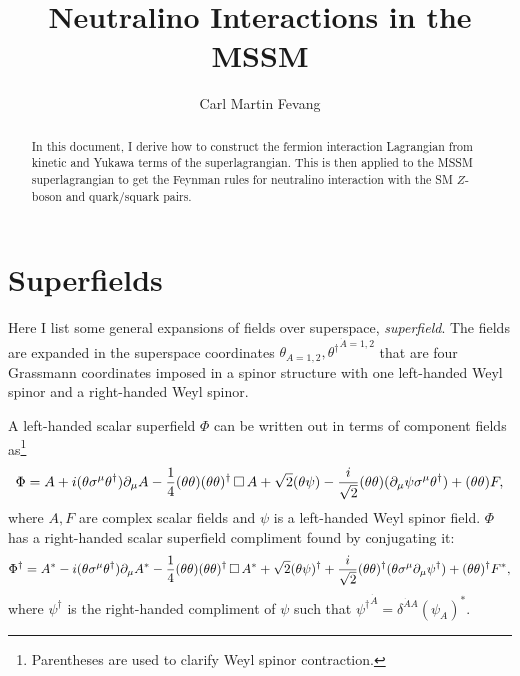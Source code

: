 \documentclass[english, notitlepage]{article}
\title{Neutralino Interactions in the MSSM}
\author{Carl Martin Fevang}
\begin{document}
\maketitle

\begin{abstract}
    \noindent
    In this document, I derive how to construct the fermion interaction Lagrangian from kinetic and Yukawa terms of the superlagrangian.
    This is then applied to the MSSM superlagrangian to get the Feynman rules for neutralino interaction with the SM \(Z\)-boson and quark/squark pairs.
\end{abstract}

\section{Superfields}
    Here I list some general expansions of fields over superspace, \textit{superfield}.
    The fields are expanded in the superspace coordinates \(\theta_{A=1,2}, {\theta^\dagger}^{\dot{A}=1,2}\) that are four Grassmann coordinates imposed in a spinor structure with one left-handed Weyl spinor and a right-handed Weyl spinor.

    A left-handed scalar superfield $\Phi$ can be written out in terms of component
    fields as\footnote{Parentheses are used to clarify Weyl spinor contraction.}
    \begin{align}
        \Phi = A + i(\theta\sigma^\mu\theta^\dagger) \partial_\mu A - \frac{1}{4} (\theta\theta)(\theta\theta)^\dagger \operatorname{\Box} A +
        \sqrt{2} (\theta\psi) - \frac{i}{\sqrt{2}} (\theta\theta) (\partial_\mu \psi \sigma^\mu \theta^\dagger) + (\theta\theta) F,
    \end{align}
    where $A, F$ are complex scalar fields and $\psi$ is a left-handed Weyl spinor field.
    $\Phi$ has a right-handed scalar superfield compliment found by conjugating it:
    \begin{align}
        \Phi^\dag = A^\ast - i(\theta\sigma^\mu\theta^\dagger) \partial_\mu A^\ast - \frac{1}{4} (\theta\theta)(\theta\theta)^\dagger \operatorname{\Box} A^\ast +
        \sqrt{2} (\theta\psi)^\dagger + \frac{i}{\sqrt{2}} (\theta\theta)^\dagger
        (\theta \sigma^\mu \partial_\mu \psi^\dagger) + (\theta\theta)^\dagger F^\ast,
    \end{align}
    where $\psi^\dagger$ is the right-handed compliment of $\psi$ such that ${\psi^\dagger}^{\dot A} = \delta^{\dot A A} {(\psi_A)}^\ast$.
\end{document}
